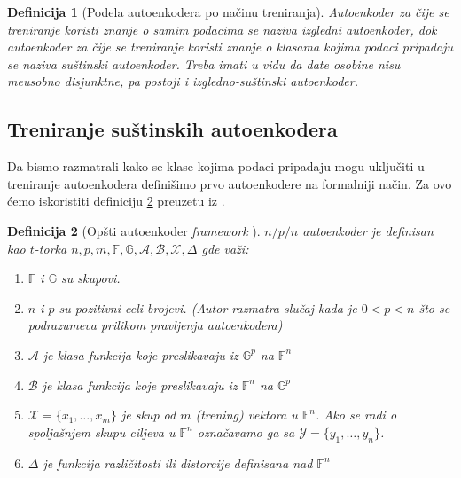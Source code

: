 \documentclass{article}
\newtheorem{definition}{Definicija}
\begin{document}
	\begin{definition}[Podela autoenkodera po na\v cinu treniranja]
		\label{autoencoder-training-based-types}
		Autoenkoder za \v cije se treniranje koristi znanje o samim podacima se naziva \emph{izgledni autoenkoder}, dok autoenkoder za \v cije se treniranje koristi znanje o klasama kojima podaci pripadaju se naziva \emph{su\v stinski autoenkoder}. Treba imati u vidu da date osobine nisu me\dj usobno disjunktne, pa postoji i \emph{izgledno-su\v stinski autoenkoder}.
	\end{definition}


	\subsection{Treniranje su\v stinskih autoenkodera}
	\label{treniranje-sustinskih-autoenkodera}
	
	Da bismo razmatrali kako se klase kojima podaci pripadaju mogu uklju\v citi u treniranje autoenkodera defini\v simo prvo autoenkodere na formalniji na\v cin. 
	Za ovo \'cemo iskoristiti definiciju \ref{general-autoencoder-framework} preuzetu iz \cite[Poglavlje 2]{pmlr-v27-baldi12a}.
	
	\begin{definition}[Op\v sti autoenkoder \textit{framework} \cite{pmlr-v27-baldi12a}]
		\label{general-autoencoder-framework}
		\sloppy $n/p/n$ autoenkoder je definisan kao $t$-torka $n, p, m, \mathbb{F}, \mathbb{G}, \mathcal{A}, \mathcal{B}, \mathcal{X}, \Delta$ gde va\v zi:
		\begin{enumerate}
			\addtolength{\itemindent}{1em}
			\item $\mathbb{F}$ i $\mathbb{G}$ su skupovi.
			\item $n$ i $p$ su pozitivni celi brojevi. (Autor razmatra slu\v caj kada je $0 < p < n$ \v sto se podrazumeva prilikom pravljenja autoenkodera)
			\item $\mathcal{A}$ je klasa funkcija koje preslikavaju iz  $\mathbb{G}^p$ na $\mathbb{F}^n$
			\item $\mathcal{B}$ je klasa funkcija koje preslikavaju iz $\mathbb{F}^n$ na $\mathbb{G}^p$
			\item $\mathcal{X} = \{x_1, \ldots, x_m\}$ je skup od $m$ (trening) vektora u $\mathbb{F}^n$. Ako se radi o spolja\v snjem skupu ciljeva u $\mathbb{F}^n$ ozna\v cavamo ga sa $\mathcal{Y} = \{y_1, \ldots, y_n\}$.
			\item $\Delta$ je funkcija razli\v citosti ili distorcije definisana nad $\mathbb{F}^n$
		\end{enumerate}
	\end{definition}
	
\end{document}
